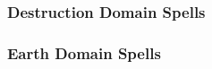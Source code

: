 \begin{spelllist}
    \SLinflictwounds[1]
    \SLcurseofbloodandbone[2]
    \SLdeathknell[3]
    \SLenervation[4]
    \SLbleed[5]
    \SLfingerofdeath[6]
    \SLstriptheflesh[7]
    \SLavatarofdeath[8]
    \SLwailofthebanshee[9]
\end{spelllist}

\subsubsection{Destruction Domain Spells}

\begin{spelllist}
    \SLrottinggrasp[1]
    \SLsoundburst[2]
    \SLrotburst[3]
    \SLshout[4]
    \SLflamestrike[5]
    \SLdisintegrate[6]
    \SLicestorm[7]
    \SLfirestorm[8]
    \SLearthquake[9]
\end{spelllist}

\begin{comment}
\subsubsection{Dragon Domain Spells}

\begin{spelllist}
    \spellhead[1]{Burning Hands}\fn{1} 1d6 fire damage.
    \spellhead[1]{Command} One subject obeys selected command for 1 round.
    \spellhead[2]{Locate Object} Senses direction toward object (specific or type).
    \spellhead[3]{Lightning Bolt}\fn{1} Large line of electricity deals 3d8 damage.
    \spellhead[4]{Fly} Subject flies at speed of 60 ft.
    \spellhead[4]{Suggestion} Compels subject to follow stated course of action.
    \spellhead[5]{Cone of Cold}\fn{1} 5d8 cold damage and brief slow in large cone.
    \spellhead[6]{Locate Entity} Locates creatures or objects within 1 mile.
    \spellhead[6]{True Seeing}\M Lets you see all things as they really are.
    \spellhead[7]{Overland Flight} You fly at a speed of 40 ft. and can hustle over long distances.
    \spellhead[7]{Power Word Blind} Blinds bloodied creature.
    \spellhead[8]{Power Word Stun} Stuns bloodied creature.
    \spellhead[9]{Power Word Kill} Kills bloodied creature.
\end{spelllist}
1 Used as a breath attack, requiring no somatic components.
\end{comment}

\subsubsection{Earth Domain Spells}

